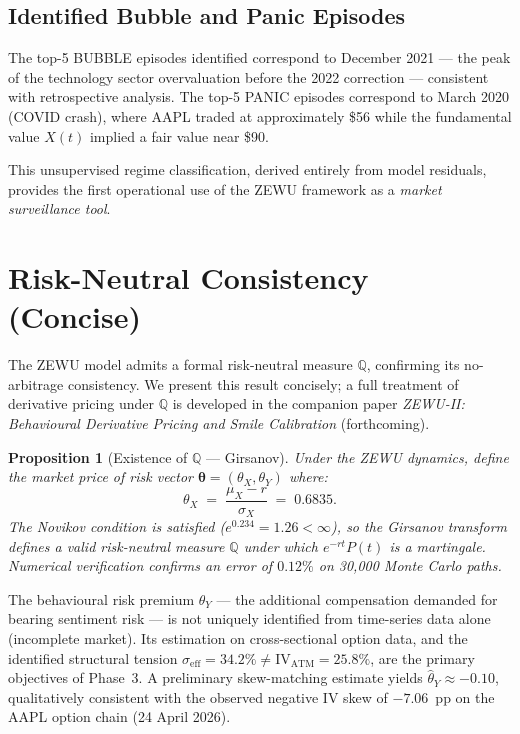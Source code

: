 \documentclass[12pt,a4paper]{article}
\newtheorem{proposition}[theorem]{Proposition}
\theoremstyle{definition}
\theoremstyle{remark}
\newcommand{\Q}{\mathbb{Q}}
\begin{document}
\subsection{Identified Bubble and Panic Episodes}

The top-5 BUBBLE episodes identified correspond to December 2021 ---
the peak of the technology sector overvaluation before the 2022
correction --- consistent with retrospective analysis. The top-5 PANIC
episodes correspond to March 2020 (COVID crash), where AAPL traded
at approximately \$56 while the fundamental value $X(t)$ implied a
fair value near \$90.

This unsupervised regime classification, derived entirely from model
residuals, provides the first operational use of the ZEWU framework as
a \emph{market surveillance tool}.

\section{Risk-Neutral Consistency (Concise)}
\label{sec:pricing}

The ZEWU model admits a formal risk-neutral measure $\Q$, confirming
its no-arbitrage consistency. We present this result concisely; a full
treatment of derivative pricing under $\Q$ is developed in the companion
paper \emph{ZEWU-II: Behavioural Derivative Pricing and Smile
Calibration} (forthcoming).

\begin{proposition}[Existence of $\Q$ --- Girsanov]
  Under the ZEWU dynamics, define the market price of risk vector
  $\boldsymbol{\theta} = (\theta_X, \theta_Y)$ where:
  \[
    \theta_X \;=\; \frac{\mu_X - r}{\sigma_X} \;=\; 0.6835.
  \]
  The Novikov condition is satisfied ($e^{0.234} = 1.26 < \infty$), so
  the Girsanov transform defines a valid risk-neutral measure $\Q$ under
  which $e^{-rt}P(t)$ is a martingale. Numerical verification confirms
  an error of $0.12\%$ on 30{,}000 Monte Carlo paths.
\end{proposition}

\noindent The behavioural risk premium $\theta_Y$ --- the additional
compensation demanded for bearing sentiment risk --- is not uniquely
identified from time-series data alone (incomplete market). Its
estimation on cross-sectional option data, and the identified structural
tension $\sigma_\mathrm{eff} = 34.2\% \neq \mathrm{IV_{ATM}} = 25.8\%$,
are the primary objectives of Phase~3. A preliminary skew-matching
estimate yields $\hat{\theta}_Y \approx -0.10$, qualitatively
consistent with the observed negative IV skew of $-7.06$~pp on the
AAPL option chain (24 April 2026).
\end{document}
